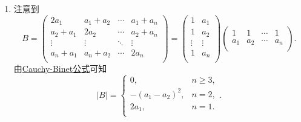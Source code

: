 \documentclass[../../main.tex]{subfiles}
\begin{document}
\begin{solution}
\begin{enumerate}[(1)]
\item 注意到$$B=\left( \begin{matrix}
2a_1 & a_1+a_2 & \cdots & a_1+a_n \\
a_2+a_1 & 2a_2 & \cdots & a_2+a_n \\
\vdots & \vdots & \ddots & \vdots \\
a_n+a_1 & a_n+a_2 & \cdots & 2a_n \\
\end{matrix} \right) =\left( \begin{matrix}
1 & a_1 \\
1 & a_2 \\
\vdots & \vdots \\
1 & a_n \\
\end{matrix} \right) \left( \begin{matrix}
1 & 1 & \cdots & 1 \\
a_1 & a_2 & \cdots & a_n \\
\end{matrix} \right).$$由\hyperref[theorem:Cauchy-Binet公式]{Cauchy-Binet公式}可知$$\left| B \right|=\begin{cases}
0, & n\ge 3, \\
-(a_1-a_2)^2, & n=2, \\
2a_1, & n=1. \\
\end{cases}.$$


\end{enumerate}
\end{solution}
\end{document}
